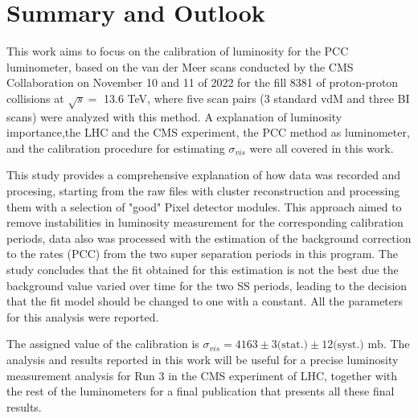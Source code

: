 \chapter{Summary and Outlook}

This work aims to focus on the calibration of luminosity for the PCC  luminometer, based on the van der Meer scans conducted by the CMS Collaboration on November 10 and 11 of 2022 for the fill 8381 of proton-proton collisions at $\sqrt{s}=$ 13.6 TeV, where five scan pairs (3 standard vdM and three BI scans) were analyzed with this method.
A explanation of luminosity importance,the LHC and the CMS experiment, the PCC method as luminometer, and the calibration procedure for estimating $\sigma_{vis}$ were all covered in this work.

This study provides a comprehensive explanation of how data was recorded and procesing, starting from the raw files with cluster reconstruction and processing them with a  selection of  "good" Pixel detector modules. This approach aimed to remove instabilities in luminosity measurement for the corresponding calibration periods,  data also was processed with the  estimation of the background correction to the rates (PCC) from the two super separation periods in this program. The study concludes that the fit obtained for this  estimation is not the best due the background value varied over time for the two SS periods, leading to the decision that the fit model should be changed to one with a constant. All the parameters for this analysis were reported.

The assigned value of the calibration is $\sigma_{vis} = 4163 \pm 3 \text{(stat.)} \pm 12 \text{(syst.)} \text{ mb}$. The analysis and results reported in this work will be useful for a precise luminosity measurement analysis for Run 3 in the CMS experiment of LHC, together with the rest of the luminometers  for a final publication that presents all these final results.
